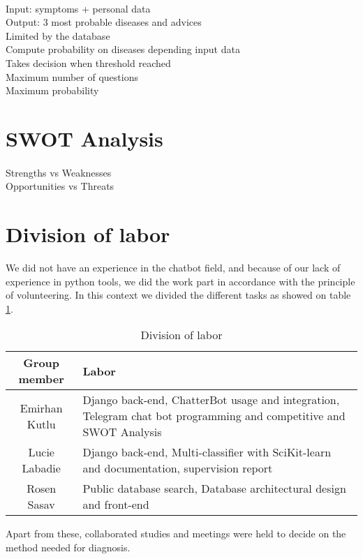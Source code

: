 \paragraph{}
Input: symptoms + personal data \\
Output: 3 most probable diseases and advices \\
Limited by the database \\
Compute probability on diseases depending input data \\
Takes decision when threshold reached \\
Maximum number of questions \\
Maximum probability 


\section{SWOT Analysis}

\paragraph{}
Strengths vs Weaknesses \\
Opportunities vs Threats

\section{Division of labor}

We did not have an experience in the chatbot field, and because of our lack of experience in python	tools, we did the work part in accordance with the principle of volunteering. In this context we divided the different tasks as showed on table \ref{labor}.
\begin{table}[H]
	\centering
	\begin{tabular}{|c|p{10cm}|}
		\hline
		\textbf{Group member} & \textbf{Labor} \\
		\hline
		Emirhan	Kutlu & Django back-end, ChatterBot usage and integration, Telegram chat bot programming and competitive and SWOT Analysis \\
		\hline
		Lucie Labadie & Django back-end, Multi-classifier with SciKit-learn and documentation, supervision report \\
		\hline
		Rosen Sasav & Public database search, Database architectural design and front-end \\
		\hline
	\end{tabular}
	\caption{Division of labor}
	\label{labor}
\end{table}	

Apart from these, collaborated studies and meetings	were held to decide on the method needed for diagnosis.
